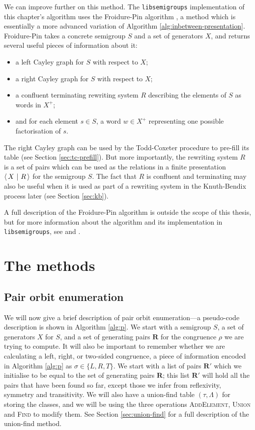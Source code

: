 We can improve further on this method.  The \texttt{libsemigroups}
implementation of this chapter's algorithm uses the Froidure-Pin algorithm
\cite{froidure-pin}, a method which is essentially a more advanced variation of
Algorithm \ref{alg:inbetween-presentation}.  Froidure-Pin takes a concrete
semigroup $S$ and a set of generators $X$, and returns several useful pieces of
information about it:
\begin{itemize}
\item a left Cayley graph for $S$ with respect to $X$;
\item a right Cayley graph for $S$ with respect to $X$;
\item a confluent terminating rewriting system $R$ describing the elements of
  $S$ as words in $X^+$;
\item and for each element $s \in S$, a word $w \in X^+$ representing one
  possible factorisation of $s$.
\end{itemize}
The right Cayley graph can be used by the Todd-Coxeter procedure to pre-fill its
table (see Section \ref{sec:tc-prefill}).  But more importantly, the rewriting
system $R$ is a set of pairs which can be used as the relations in a finite
presentation $\left\langle\,X ~\middle|~ R\,\right\rangle$ for the semigroup $S$.  The fact that $R$ is confluent
and terminating may also be useful when it is used as part of a rewriting system
in the Knuth-Bendix process later (see Section \ref{sec:kb}).

A full description of the Froidure-Pin algorithm is outside the scope of this
thesis, but for more information about the algorithm and its implementation in
\texttt{libsemigroups}, see \cite{froidure-pin} and \cite{froidure-pin-jonusas}.

\section{The methods}

\subsection{Pair orbit enumeration}
\label{sec:p}

We will now give a brief description of pair orbit enumeration---a pseudo-code
description is shown in Algorithm \ref{alg:p}.  We start with a semigroup $S$, a
set of generators $X$ for $S$, and a set of generating pairs $\mathbf{R}$ for
the congruence $\rho$ we are trying to compute.  It will also be important to
remember whether we are calculating a left, right, or two-sided congruence, a
piece of information encoded in Algorithm \ref{alg:p} as $\sigma \in \{L,R,T\}$.
We start with a list of pairs $\mathbf{R}'$ which we initialise to be equal to
the set of generating pairs $\mathbf{R}$; this list $\mathbf{R}'$ will hold all
the pairs that have been found so far, except those we infer from reflexivity,
symmetry and transitivity.  We will also have a union-find table
$(\tau,\Lambda)$ for storing the classes, and we will be using the three
operations \textsc{AddElement}, \textsc{Union} and \textsc{Find} to modify them.
See Section \ref{sec:union-find} for a full description of the union-find
method.

